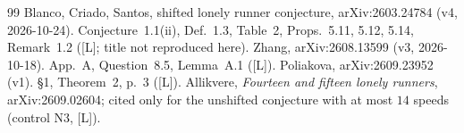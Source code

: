 \documentclass[10pt]{article}
\newcommand{\tier}[1]{\textsf{[#1]}}
\newcommand{\tL}{\tier{L}}
\begin{document}
\begin{thebibliography}{99}\small
{} Blanco, Criado, Santos, shifted lonely runner conjecture, arXiv:2603.24784 (v4, 2026-10-24). Conjecture~1.1(ii), Def.~1.3, Table~2, Props.~5.11, 5.12, 5.14, Remark~1.2 (\tL; title not reproduced here).
 Zhang, arXiv:2608.13599 (v3, 2026-10-18). App.~A, Question~8.5, Lemma~A.1 (\tL).
 Poliakova, arXiv:2609.23952 (v1). \S1, Theorem~2, p.~3 (\tL).
 Allikvere, \emph{Fourteen and fifteen lonely runners}, arXiv:2609.02604; cited only for the unshifted conjecture with at most $14$ speeds (control N3, \tL).
\end{thebibliography}
\end{document}
